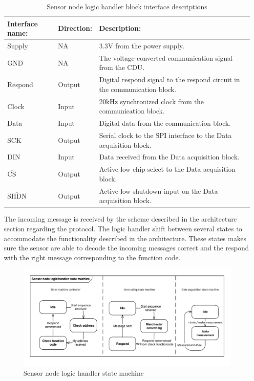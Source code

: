 \begin{table}[H]
	\centering
	\begin{tabular}{|p{3cm} |p{2cm} | p{8cm}| }
		\hline
		Interface name: 			& Direction: 	& Description: \\ \hline
		Supply						& NA			& 3.3V from the power supply. \\ \hline
		GND							& NA			& The voltage-converted communication signal from the CDU.\\ \hline
		Respond		  				& Output		& Digital respond signal to the respond circuit in the communication block. \\ \hline
		Clock						& Input			& 20kHz synchronized clock from the communication block.\\\hline 
		Data						& Input			& Digital data from the communication block.\\\hline
		SCK							& Output		& Serial clock to the SPI interface to the Data acquisition block.\\\hline
		DIN							& Input			& Data received from the Data acquisition block.\\\hline
		$\overline{\text{CS}}$		& Output		& Active low chip select to the Data acquisition block.\\\hline
		$\overline{\text{SHDN}}$	& Output		& Active low shutdown input on the Data acquisition block.\\\hline
	\end{tabular}
	\caption{Sensor node logic handler block interface descriptions}
\end{table}

The incoming message is received by the scheme described in the architecture section regarding the protocol. The logic handler shift between several states to accommodate the functionality described in the architecture. These states makes sure the sensor are able to decode the incoming messages correct and the respond with the right message corresponding to the function code. 

\begin{figure}[H]
	\centering
	\includegraphics[width=1\textwidth]{billeder/logic_handler_stm}
	\caption{Sensor node logic handler state machine}
\end{figure}

